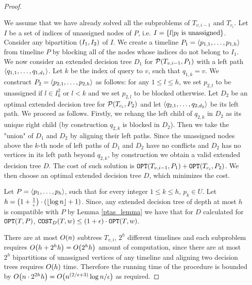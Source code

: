 \begin{theorem}
\begin{proof}
\begin{enumerate}
        We assume that we have already solved all the subproblems of $T_{v,i-1}$ and $T_{c_i}$. Let $I$ be a set of indices of unassigned nodes of $P$, i.e. $I=\mathopen{}\left\{ l | p_l \text{ is unassigned} \right\}$. Consider any bipartition $\mathopen{}\left( I_1, I_2 \right)$ of $I$. We create a timeline $P_1=\mathopen{}\langle p_{1,1},\dots,p_{1,h} \rangle$ from timeline $P$ by blocking all of the nodes whose indices do not belong to $I_1$. We now consider an extended decision tree $D_1$ for $\mathcal{P}\mathopen{}\left( T_{v,i-1}, P_1 \right)$ with a left path $\mathopen{}\langle q_{1,1},\dots,q_{1,d_1} \rangle$. Let $k$ be the index of query to $v$, such that $q_{1,k}=v$. We construct $P_2=\mathopen{}\langle p_{2,1},\dots, p_{2,h} \rangle$ as follows: for any $1\leq l\leq h$, we set $p_{2,l}$ to be unassigned if $l\in I_k^2$ or $l < k$ and we set $p_{2,l}$ to be blocked otherwise. Let $D_2$ be an optimal extended decision tree for $\mathcal{P}\mathopen{}\left( T_{c_i}, P_2 \right)$ and let $\mathopen{}\langle q_{2,1},\dots,q_{2,d_2} \rangle$ be its left path. We proceed as follows. Firstly, we rehang the left child of $q_{2,k}$ in $D_2$ as its unique right child (by construction $q_{2,k}$ is blocked in $D_2$). Then we take the "union" of $D_1$ and $D_2$ by aligning their left paths. Since the unassigned nodes above the $k$-th node of left paths of $D_1$ and $D_2$ have no conflicts and $D_2$ has no vertices in its left path beyond $q_{2,k}$, by construction we obtain a valid extended decision tree $D$. The cost of such solution is $\texttt{OPT}\mathopen{}\left( T_{v,i-1}, P_1 \right)+\texttt{OPT}\mathopen{}\left( T_{c_i}, P_2 \right)$. We then choose an optimal extended decision tree $D$, which minimizes the cost.
    \end{enumerate}
    

    Let $P=\mathopen{}\langle p_1,\dots,p_h \rangle$, such that for every integer $1\leq k \leq h$, $p_k\in U$. Let $h=\mathopen{}\left( 1+\frac{1}{\epsilon} \right)\cdot\mathopen{}\left( \mathopen{}\left\lfloor \log n \right\rfloor+1 \right)$. Since, any extended decision tree of depth at most $h$ is compatible with $P$ by Lemma \ref{ptas_lemma} we have that for $D$ calculated for $\texttt{OPT}\mathopen{}\left( T, P \right)$,
    $\texttt{COST}_{D}\mathopen{}\left( T,w \right)\leq \mathopen{}\left( 1+\epsilon \right)\cdot\texttt{OPT}\mathopen{}\left( T,w \right)$.

    There are at most $O\mathopen{}\left( n \right)$ subtrees $T_{v,i}$, $2^h$ different timelines and each subproblem requires $O\mathopen{}\left( h+2^hh \right)=O\mathopen{}\left( 2^hh \right)$ amount of computation, since there are at most $2^h$ bipartitions of unassigned vertices of any timeline and aligning two decision trees requires $O\mathopen{}\left( h \right)$ time. Therefore the running time of the procedure is bounded by $O\mathopen{}\left( n\cdot 2^{2h}h \right)=O\mathopen{}\left( n^{\mathopen{}\left( 2/\epsilon+3 \right)}\log n/\epsilon \right)$ as required.
    
\end{proof}
\end{theorem}
